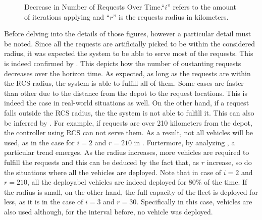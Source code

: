 \begin{figure}[t]
	\caption[Decrease in Number of Requests Over Time]{Decrease in Number of Requests Over Time.``$i$'' refers to the amount of iterations applying  and ``$r$'' is the requests radius in kilometers.}
	\label{fig:requests_km_r}
\end{figure}
Before delving into the details of those figures, however a particular detail must be noted. Since all the requests are artificially picked to be within the considered radius, it was expected the system to be able to serve most of the requests. This is indeed confirmed by . This depicts how the number of oustanting requests decreases over the horizon time. As expected, as long as the requests are within the RCS radius, the system is able to fulfill all of them. Some cases are faster than other due to the distance from the depot to the request locations. This is indeed the case in real-world situations as well. On the other hand, if a request falls outside the RCS radius, the the system is not able to fulfill it. This can also be inferred by . For example, if requests are over 210 kilometers from the depot, the controller using RCS can not serve them. As a result, not all vehicles will be used, as in the case for $i=2$ and $r=210$ in . Furtermore, by analyzing , a particular trend emerges. As the radius increases, more vehicles are required to fulfill the requests and this can be deduced by the fact that, as $r$ increase, so do the situations where all the vehicles are deployed. Note that in case of $i=2$ and $r=210$, all the deployabel vehicles are indeed deployed for 80\% of the time. If the radius is small, on the other hand, the full capacity of the fleet is deployed for less, as it is in the case of $i=3$ and $r=30$. Specifically in this case, vehicles are also used although, for the interval before, no vehicle was deployed. 




